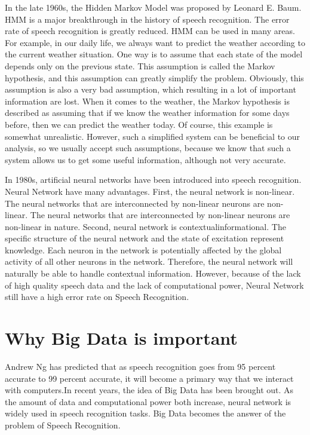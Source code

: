 \documentclass[sigconf]{acmart}
\begin{document}
In the late 1960s, the Hidden Markov Model was proposed by Leonard E. Baum. HMM is a major breakthrough in the history of speech recognition. The error rate of speech recognition is greatly reduced\cite{hmm}.  HMM can be used in many areas. For example, in our daily life, we always want to predict the weather according to the current weather situation. One way is to assume that each state of the model depends only on the previous state. This assumption is called the Markov hypothesis, and this assumption can greatly simplify the problem. Obviously, this assumption is also a very bad assumption, which resulting in a lot of important information are lost. When it comes to the weather, the Markov hypothesis is described as assuming that if we know the weather information for some days before, then we can predict the weather today. Of course, this example is somewhat unrealistic. However, such a simplified system can be beneficial to our analysis, so we usually accept such assumptions, because we know that such a system allows us to get some useful information, although not very accurate.

In 1980s, artificial neural networks have been introduced into speech recognition\cite{ann}. Neural Network have many advantages. First, the neural network is non-linear. The neural networks that are interconnected by non-linear neurons are non-linear. The neural networks that are interconnected by non-linear neurons are non-linear in nature. Second, neural network is contextualinformational. The specific structure of the neural network and the state of excitation represent knowledge. Each neuron in the network is potentially affected by the global activity of all other neurons in the network. Therefore, the neural network will naturally be able to handle contextual information. However, because of the lack of high quality speech data and the lack of computational power,  Neural Network still have a high error rate on Speech Recognition.

\section{Why Big Data is important}
Andrew Ng has predicted that as speech recognition goes from 95 percent accurate to 99 percent accurate, it will become a primary way that we interact with computers\cite{medium}.In recent years, the idea of Big Data has been brought out. As the amount of data and computational power both increase, neural network is widely used in speech recognition tasks. Big Data becomes the answer of the problem of Speech Recognition.
\end{document}
